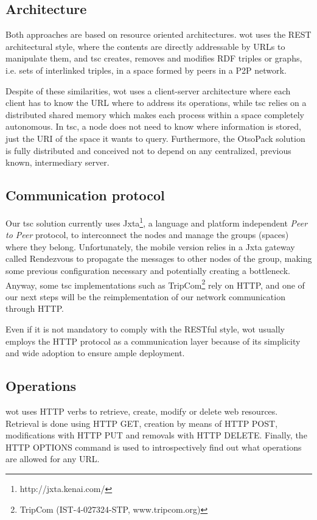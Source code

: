 \subsection{Architecture}
Both approaches are based on resource oriented architectures. \ac{wot} uses the REST architectural style, where the contents are directly addressable by
URLs to manipulate them, and \ac{tsc} creates, removes and modifies RDF triples or graphs, i.e. sets of interlinked triples, in a space formed by peers
in a P2P network.

Despite of these similarities, \ac{wot} uses a client-server architecture where each client has to know the URL where to address its operations, while
\ac{tsc} relies on a distributed shared memory which makes each process within a space completely autonomous. In \ac{tsc}, a node does not need to know where
information is stored, just the URI of the space it wants to query. Furthermore, the OtsoPack solution is fully distributed and conceived not to depend
on any centralized, previous known, intermediary server.

\subsection{Communication protocol}
Our \ac{tsc} solution currently uses Jxta\footnote{http://jxta.kenai.com/}, a language and platform independent \textit{Peer to Peer} protocol, to
interconnect the nodes and manage the groups (spaces) where they belong. Unfortunately, the mobile version relies in a Jxta gateway called Rendezvous
to propagate the messages to other nodes of the group, making some previous configuration necessary and potentially creating a bottleneck. Anyway,
some \ac{tsc} implementations such as TripCom\footnote{TripCom (IST-4-027324-STP, www.tripcom.org)} rely on HTTP, and one of our next steps will be the
reimplementation of our network communication through HTTP.

Even if it is not mandatory to comply with the RESTful style, \ac{wot} usually employs the HTTP protocol as a communication layer because of its
simplicity and wide adoption to ensure ample deployment.

\subsection{Operations}
\ac{wot} uses HTTP verbs to retrieve, create, modify or delete web resources. Retrieval is done using HTTP GET, creation by means of HTTP POST,
modifications with HTTP PUT and removals with HTTP DELETE. Finally, the HTTP OPTIONS command is used to introspectively find out what operations are
allowed for any URL.

